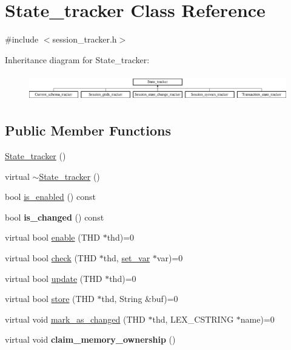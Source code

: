 \hypertarget{classState__tracker}{}\section{State\+\_\+tracker Class Reference}
\label{classState__tracker}


{\ttfamily \#include $<$session\+\_\+tracker.\+h$>$}

Inheritance diagram for State\+\_\+tracker\+:\begin{figure}[H]
\begin{center}
\leavevmode
\includegraphics[height=1.160622cm]{classState__tracker}
\end{center}
\end{figure}
\subsection*{Public Member Functions}
\begin{DoxyCompactItemize}
\item 
\mbox{\hyperlink{classState__tracker_a571c37e501f7cfde9b4b8302d5d91cd8}{State\+\_\+tracker}} ()
\item 
virtual \mbox{\hyperlink{classState__tracker_aa5166c8da02624bae36ec7871d411af9}{$\sim$\+State\+\_\+tracker}} ()
\item 
bool \mbox{\hyperlink{classState__tracker_a99311fbb724be3f1bcf5bb34a4f1a873}{is\+\_\+enabled}} () const
\item 
\mbox{\label{classState__tracker_aa24e7f8855458f2696ea1b2334f507bb}} 
bool {\bfseries is\+\_\+changed} () const
\item 
virtual bool \mbox{\hyperlink{classState__tracker_a65cd4b0d77f079f4c41620c0bf314939}{enable}} (T\+HD $\ast$thd)=0
\item 
virtual bool \mbox{\hyperlink{classState__tracker_a50923266a6300e657b70dc4f0125782c}{check}} (T\+HD $\ast$thd, \mbox{\hyperlink{classset__var}{set\+\_\+var}} $\ast$var)=0
\item 
virtual bool \mbox{\hyperlink{classState__tracker_a74ffdcb79733e8d31e9fe2dcae346022}{update}} (T\+HD $\ast$thd)=0
\item 
virtual bool \mbox{\hyperlink{classState__tracker_aee5cd5c5ed19fbd4c8ac01dbd62471e7}{store}} (T\+HD $\ast$thd, String \&buf)=0
\item 
virtual void \mbox{\hyperlink{classState__tracker_afb865d3837c0f8fc9cd36d5234142b32}{mark\+\_\+as\+\_\+changed}} (T\+HD $\ast$thd, L\+E\+X\+\_\+\+C\+S\+T\+R\+I\+NG $\ast$name)=0
\item 
\mbox{\label{classState__tracker_a2ec639ab51af306de04bf453c92460d0}} 
virtual void {\bfseries claim\+\_\+memory\+\_\+ownership} ()
\end{DoxyCompactItemize}
